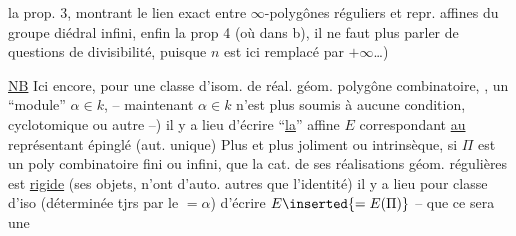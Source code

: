 la prop. 3,  montrant le lien exact entre $\infty$-polygônes réguliers et repr. affines du groupe diédral infini, enfin la prop 4 (où dans b),  il ne faut plus parler de questions de divisibilité, puisque $n$ est ici remplacé par $+\infty$\ldots)

\uline{NB} Ici encore, pour une classe d'isom. de réal. géom.   polygône combinatoire, ,   un ``module'' $\alpha\in k$, -- maintenant $\alpha\in k$ n'est plus soumis à aucune condition, cyclotomique ou autre --) il y a lieu d'écrire ``\uline{la}''  affine $E$ correspondant \uline{au} représentant épinglé (aut. unique) Plus  et plus joliment ou intrinsèque, si $\Pi$ est un poly combinatoire fini ou infini,  que la cat. de ses réalisations géom. régulières est \uline{rigide} (ses objets, n'ont d'auto. autres que l'identité) il y a lieu pour  classe d'iso (déterminée tjrs par le $=\alpha$) d'écrire $E\inserted{=E(\Pi)}$ --  que ce sera une
